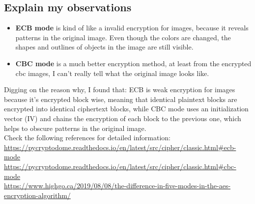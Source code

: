 \documentclass{article}
\begin{document}
\subsection{Explain my observations}
\begin{itemize}
  \item \textbf{ECB mode} is kind of like a invalid encryption for images, because it reveals patterns in the original image. Even though the colors are changed, the shapes and outlines of objects in the image are still visible.
  \item \textbf{CBC mode} is a much better encryption method, at least from the encrypted cbc images, I can't really tell what the original image looks like.
\end{itemize}
Digging on the reason why, I found that: ECB is weak encryption for images because it's encrypted block wise, meaning that identical plaintext blocks are encrypted into identical ciphertext blocks, while CBC mode uses an initialization vector (IV) and chains the encryption of each block to the previous one, which helps to obscure patterns in the original image.\\
Check the following references for detailed information:\\
\url{https://pycryptodome.readthedocs.io/en/latest/src/cipher/classic.html#ecb-mode}\\
\url{https://pycryptodome.readthedocs.io/en/latest/src/cipher/classic.html#cbc-mode}\\
\url{https://www.highgo.ca/2019/08/08/the-difference-in-five-modes-in-the-aes-encryption-algorithm/}
\end{document}
